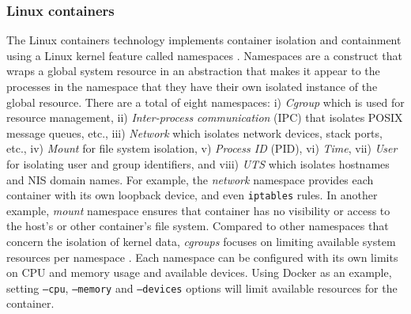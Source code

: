 \documentclass[english, 12pt, a4paper, sci, utf8, a-2b, online]{aaltothesis}
\begin{document}
\subsubsection{Linux containers}

The Linux containers technology implements container isolation and containment using a Linux kernel feature called namespaces \cite{lin2018measurement}.
Namespaces \cite{manpages-namespace} are a construct that wraps a global system resource in an abstraction that makes it appear to the processes in the namespace that they have their own isolated instance of the global resource.
There are a total of eight namespaces: i) \emph{Cgroup} which is used for resource management, ii) \emph{Inter-process communication} (IPC) that isolates POSIX message queues, etc., iii) \emph{Network} which isolates network devices, stack ports, etc., iv) \emph{Mount} for file system isolation, v) \emph{Process ID} (PID), vi) \emph{Time}, vii) \emph{User} for isolating user and group identifiers, and viii) \emph{UTS} which isolates hostnames and NIS domain names.
For example, the \emph{network} namespace provides each container with its own loopback device, and even \texttt{iptables} rules.
In another example, \emph{mount} namespace ensures that container has no visibility or access to the host's or other container's file system.
Compared to other namespaces that concern the isolation of kernel data, \emph{cgroups} focuses on limiting available system resources per namespace \cite{lin2018measurement}.
Each namespace can be configured with its own limits on CPU and memory usage and available devices.
Using Docker as an example, setting \texttt{--cpu}, \texttt{--memory} and \texttt{--devices} options will limit available resources for the container.
\end{document}
